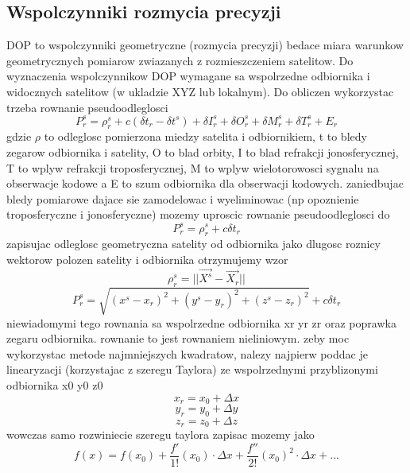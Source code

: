 \documentclass[twocolumn]{article}
\begin{document}
\subsection{Wspolczynniki rozmycia precyzji}
DOP to wspolczynniki geometryczne (rozmycia precyzji) bedace miara warunkow geometrycznych pomiarow zwiazanych z rozmieszczeniem satelitow. Do wyznaczenia wspolczynnikow DOP wymagane sa wspolrzedne odbiornika i widocznych satelitow (w ukladzie XYZ lub lokalnym).
Do obliczen wykorzystac trzeba rownanie pseudoodleglosci
\begin{equation}
P^s_r = \rho_r^s + c(\delta t_r -\delta t^s) + \delta I_r^s+\delta O_r^s+\delta M_r^s+\delta T_r^s+E_r
\end{equation}
gdzie \(\rho\) to odleglosc pomierzona miedzy satelita i odbiornikiem, t to bledy zegarow odbiornika i satelity, O to blad orbity, I to blad refrakcji jonosferycznej, T to wplyw refrakcji troposferycznej, M to wplyw wielotorowosci sygnalu na obserwacje kodowe a E to szum odbiornika dla obserwacji kodowych. zaniedbujac bledy pomiarowe dajace sie zamodelowac i wyeliminowac (np opoznienie troposferyczne i jonosferyczne) mozemy uproscic rownanie pseudoodleglosci do
\begin{equation}
P^s_r = \rho_r^s + c\delta t_r
\end{equation}
zapisujac odleglosc geometryczna satelity od odbiornika jako dlugosc roznicy wektorow polozen satelity i odbiornika otrzymujemy wzor
\begin{equation}
\rho^s_r = ||\vec{X^s}-\vec{X_r}||
\end{equation}
\begin{equation}
P^s_r = \sqrt{(x^s-x_r)^2+(y^s-y_r)^2+(z^s-z_r)^2} + c\delta t_r
\end{equation}
niewiadomymi tego rownania sa wspolrzedne odbiornika xr yr zr oraz poprawka zegaru odbiornika. rownanie to jest rownaniem nieliniowym. zeby moc wykorzystac metode najmniejszych kwadratow, nalezy najpierw poddac je linearyzacji (korzystajac z szeregu Taylora) ze wspolrzednymi przyblizonymi odbiornika x0 y0 z0
\begin{equation}
x_r = x_0 + \Delta x
\end{equation}
\begin{equation}
y_r = y_0 + \Delta y
\end{equation}
\begin{equation}
z_r = z_0 + \Delta z
\end{equation}
wowczas samo rozwiniecie szeregu taylora zapisac mozemy jako
\begin{equation}
f(x)=f(x_0)+\frac{f'}{1!}(x_0)\cdot\Delta x+\frac{f''}{2!}(x_0)^2\cdot\Delta x + ...
\end{equation}
\end{document}
